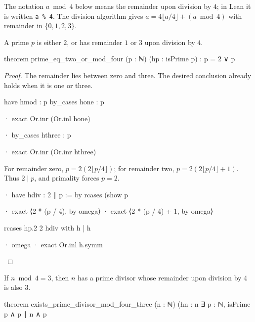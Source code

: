 The notation $a\bmod4$ below means the remainder upon division by $4$; in Lean it is written
\texttt{a \% 4}.
The division algorithm gives $a=4\lfloor a/4\rfloor+(a\bmod4)$ with remainder in $\{0,1,2,3\}$.

\begin{lemma}
  \label{ent:lem:prime-remainders-four}
  A prime $p$ is either $2$, or has remainder $1$ or $3$ upon division by $4$.

  \begin{lean}
    theorem prime_eq_two_or_mod_four (p : ℕ) (hp : isPrime p) :
        p = 2 ∨ p %
  \end{lean}
\end{lemma}

\begin{proof}
  The remainder lies between zero and three.
  The desired conclusion already holds when it is one or three.

  \begin{lean}
    have hmod : p %
    by_cases hone : p %

    · exact Or.inr (Or.inl hone)

    · by_cases hthree : p %

      · exact Or.inr (Or.inr hthree)
  \end{lean}

  For remainder zero, $p=2(2\lfloor p/4\rfloor)$; for remainder two, $p=2(2\lfloor p/4\rfloor+1)$.
  Thus $2\mid p$, and primality forces $p=2$.

  \begin{lean}
    · have hdiv : 2 ∣ p := by
        rcases (show p %

        · exact ⟨2 * (p / 4), by omega⟩
        · exact ⟨2 * (p / 4) + 1, by omega⟩

      rcases hp.2 2 hdiv with h | h

      · omega
      · exact Or.inl h.symm
  \end{lean}

\end{proof}

\begin{lemma}
  \label{ent:lem:prime-divisor-four-mul-add-three}
  If $n\bmod4=3$, then $n$ has a prime divisor whose remainder upon division by $4$ is also $3$.

  \begin{lean}
    theorem exists_prime_divisor_mod_four_three (n : ℕ) (hn : n %
        ∃ p : ℕ, isPrime p ∧ p ∣ n ∧ p %
  \end{lean}
\end{lemma}

